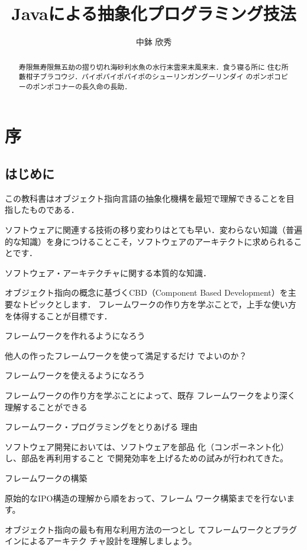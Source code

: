 \documentclass[a4j,papersize]{jsbook}
\title{Javaによる抽象化プログラミング技法}
\author{中鉢 欣秀}
\begin{document}
\maketitle
\tableofcontents

\chapter*{序}

\begin{abstract}
寿限無寿限無五劫の摺り切れ海砂利水魚の水行末雲来末風来末．食う寝る所に
住む所藪柑子ブラコウジ．パイポパイポパイポのシューリンガングーリンダイ
のポンポコピーのポンポコナーの長久命の長助．
\end{abstract}

\section*{はじめに}

この教科書はオブジェクト指向言語の抽象化機構を最短で理解できることを目
指したものである．

ソフトウェアに関連する技術の移り変わりはとても早い．変わらない知識（普遍的な知識）を身につけることこそ，ソフトウェアのアーキテクトに求められることです．

ソフトウェア・アーキテクチャに関する本質的な知識．

オブジェクト指向の概念に基づくCBD（Component Based Development）を主要なトピックとします．
フレームワークの作り方を学ぶことで，上手な使い方を体得することが目標です．

フレームワークを作れるようになろう 

他人の作ったフレームワークを使って満足するだけ
でよいのか？ 

フレームワークを使えるようになろう 

フレームワークの作り方を学ぶことによって、既存
フレームワークをより深く理解することができる 

フレームワーク・プログラミングをとりあげる
理由 

ソフトウェア開発においては、ソフトウェアを部品
化（コンポーネント化）し、部品を再利用すること
で開発効率を上げるための試みが行われてきた。 

フレームワークの構築 

原始的なIPO構造の理解から順をおって、フレーム
ワーク構築までを行ないます。 

オブジェクト指向の最も有用な利用方法の一つとし
てフレームワークとプラグインによるアーキテク
チャ設計を理解しましょう。 
\end{document}
